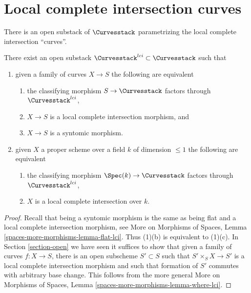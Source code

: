 \section{Local complete intersection curves}
\label{section-lci}

\noindent
There is an open substack of $\Curvesstack$ parametrizing
the local complete intersection ``curves''.

\begin{lemma}
\label{lemma-lci-curves}
There exist an open substack $\Curvesstack^{lci} \subset \Curvesstack$
such that
\begin{enumerate}
\item given a family of curves $X \to S$ the following are equivalent
\begin{enumerate}
\item the classifying morphism $S \to \Curvesstack$ factors through
$\Curvesstack^{lci}$,
\item $X \to S$ is a local complete intersection morphism, and
\item $X \to S$ is a syntomic morphism.
\end{enumerate}
\item given $X$ a proper scheme over a field $k$ of dimension $\leq 1$
the following are equivalent
\begin{enumerate}
\item the classifying morphism $\Spec(k) \to \Curvesstack$ factors
through $\Curvesstack^{lci}$,
\item $X$ is a local complete intersection over $k$.
\end{enumerate}
\end{enumerate}
\end{lemma}

\begin{proof}
Recall that being a syntomic morphism is the same as being flat and
a local complete intersection morphism, see
More on Morphisms of Spaces, Lemma \ref{spaces-more-morphisms-lemma-flat-lci}.
Thus (1)(b) is equivalent to (1)(c).
In Section \ref{section-open} we have seen
it suffices to show that given a family of curves
$f : X \to S$, there is an open subscheme $S' \subset S$
such that $S' \times_S X \to S'$ is a local complete intersection
morphism and such that formation of $S'$ commutes with arbitrary base change.
This follows from the more general
More on Morphisms of Spaces, Lemma \ref{spaces-more-morphisms-lemma-where-lci}.
\end{proof}





